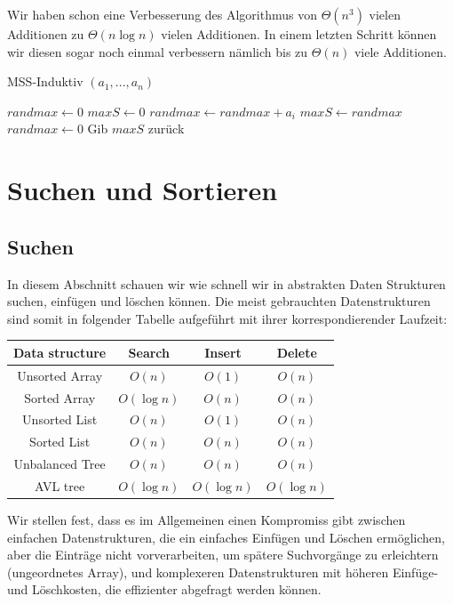 \documentclass[a4paper]{article}
\begin{document}
    Wir haben schon eine Verbesserung des Algorithmus von $\Theta(n^3)$ vielen Additionen zu $\Theta(n\log n)$ vielen Additionen. In einem letzten Schritt können wir diesen sogar noch einmal verbessern nämlich bis zu $\Theta(n)$ viele Additionen.

\begin{algorithm}
 \caption{MSS-Induktiv $(a_1,..., a_n)$}
 \label{alg:MSS-Induktiv}
    \begin{algorithmic}[1]
    \State $randmax \gets 0$
    \State $maxS \gets 0$
            \State $randmax \gets randmax + a_i$
                \State $maxS \gets randmax$
            \EndIf
                \State $randmax \gets 0$
            \EndIf
        \State Gib $maxS$ zurück
        \EndFor
    \EndFunction
    \end{algorithmic}
\end{algorithm}

\newpage
\section{Suchen und Sortieren}
\subsection{Suchen}
    In diesem Abschnitt schauen wir wie schnell wir in abstrakten Daten Strukturen suchen, einfügen und löschen können. Die meist gebrauchten Datenstrukturen sind somit in folgender Tabelle aufgeführt mit ihrer korrespondierender Laufzeit: \\
\begin{center}      
\begin{tabular} {|c|c|c|c|}
  \hline
  \label{Tab: LaufzeitenSuchSortier}
  \bfseries Data structure & \bfseries Search & \bfseries Insert & \bfseries Delete\\
  \hline
  Unsorted Array	&$O(n)$				&$O(1)$			&$O(n)$\\
  Sorted Array		&$O(\log{n})$	          	&$O(n)$			&$O(n)$\\
  Unsorted List 	&$O(n)$				&$O(1)$			&$O(n)$\\	
  Sorted List		&$O(n)$				&$O(n)$			&$O(n)$\\	
  Unbalanced Tree	&$O(n)$				&$O(n)$			&$O(n)$\\
  AVL tree		&$O(\log{n})$	        	&$O(\log{n})$	        &$O(\log{n})$\\
  \hline
\end{tabular}
\end{center}  
Wir stellen fest, dass es im Allgemeinen einen Kompromiss gibt zwischen einfachen Datenstrukturen, die ein einfaches Einfügen und Löschen ermöglichen, aber die Einträge nicht vorverarbeiten, um spätere Suchvorgänge zu erleichtern (ungeordnetes Array), und komplexeren Datenstrukturen mit höheren Einfüge- und Löschkosten, die effizienter abgefragt werden können.
\end{document}
